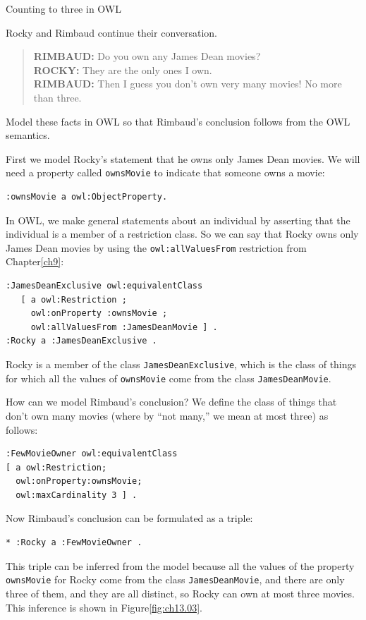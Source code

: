 \begin{challenge}{Counting to three in OWL}
\label{chal:count3}

Rocky and Rimbaud continue their conversation.

\begin{quote}
\textbf{RIMBAUD:} Do you own any James Dean movies? \\
\textbf{ROCKY:} They are the only ones I own. \\
\textbf{RIMBAUD:} Then I guess you don't own very many movies! No more than three.\\
\end{quote}

Model these facts in OWL so that Rimbaud's conclusion follows from the
OWL semantics.

\solution

First we model Rocky's statement that he owns only James Dean movies. We
will need a property called
\texttt{ownsMovie} to indicate that someone owns a movie:

\begin{lstlisting}
:ownsMovie a owl:ObjectProperty.
\end{lstlisting}

In OWL, we make general statements about an individual by asserting that
the individual is a member of a restriction class. So we can say that
Rocky owns only James Dean movies by using the \texttt{owl:allValuesFrom}
restriction from Chapter\ref{ch9}:

\begin{lstlisting}
:JamesDeanExclusive owl:equivalentClass
   [ a owl:Restriction ;
     owl:onProperty :ownsMovie ;
     owl:allValuesFrom :JamesDeanMovie ] .
:Rocky a :JamesDeanExclusive .
\end{lstlisting}

Rocky is a member of the class \texttt{JamesDeanExclusive}, which is the class of
things for which all the values of \texttt{ownsMovie} come from the class
\texttt{JamesDeanMovie}.

How can we model Rimbaud's conclusion? We define the class of things
that don't own many movies (where by
``not many,'' we mean at most three) as follows:

\begin{lstlisting}
:FewMovieOwner owl:equivalentClass
[ a owl:Restriction; 
  owl:onProperty:ownsMovie;
  owl:maxCardinality 3 ] .
\end{lstlisting}

Now Rimbaud's conclusion can be formulated as a triple:

\begin{lstlisting}
* :Rocky a :FewMovieOwner .
\end{lstlisting}

This triple can be inferred from the model because all the values of the
property \texttt{ownsMovie} for Rocky come from the class \texttt{JamesDeanMovie}, and
there are only three of them, and they are all distinct, so Rocky can
own at most three movies. This inference is shown in Figure\ref{fig:ch13.03}.

\end{challenge}
